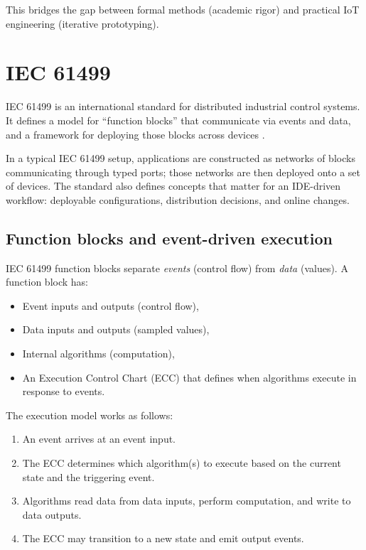 This bridges the gap between formal methods (academic rigor) and practical IoT engineering (iterative prototyping).

\section{IEC 61499}

IEC 61499 is an international standard for distributed industrial control systems.
It defines a model for ``function blocks'' that communicate via events and data, and a framework for deploying those blocks across devices \cite{IEC61499}.

In a typical IEC 61499 setup, applications are constructed as networks of blocks communicating through typed ports; those networks are then deployed onto a set of devices.
The standard also defines concepts that matter for an IDE-driven workflow: deployable configurations, distribution decisions, and online changes.

\subsection{Function blocks and event-driven execution}

IEC 61499 function blocks separate \emph{events} (control flow) from \emph{data} (values).
A function block has:
\begin{itemize}
  \item Event inputs and outputs (control flow),
  \item Data inputs and outputs (sampled values),
  \item Internal algorithms (computation),
  \item An Execution Control Chart (ECC) that defines when algorithms execute in response to events.
\end{itemize}


The execution model works as follows:
\begin{enumerate}
  \item An event arrives at an event input.
  \item The ECC determines which algorithm(s) to execute based on the current state and the triggering event.
  \item Algorithms read data from data inputs, perform computation, and write to data outputs.
  \item The ECC may transition to a new state and emit output events.
\end{enumerate}

